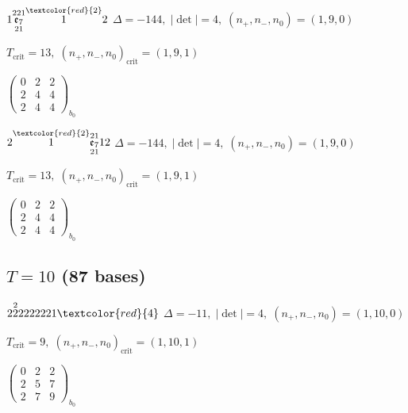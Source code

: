 \documentclass[10pt]{article}
\begin{document}
\smallskip

$1\overset{221}{\underset{21}{\mathfrak{e}_7}}\overset{\textcolor{red}{2}}{1}2$ \quad $\Delta=-144,\; |\det|=4,\; (n_+,n_-,n_0)=(1,9,0)$

\hspace{1em}$T_{\text{crit}}=13,\; (n_+,n_-,n_0)_{\text{crit}}=(1,9,1)$

\hspace{2em}$\left(\begin{smallmatrix}0 & 2 & 2 \\ 2 & 4 & 4 \\ 2 & 4 & 4\end{smallmatrix}\right)_{\!b_0}$

\smallskip

$2\overset{\textcolor{red}{2}}{1}\overset{21}{\underset{21}{\mathfrak{e}_7}}12$ \quad $\Delta=-144,\; |\det|=4,\; (n_+,n_-,n_0)=(1,9,0)$

\hspace{1em}$T_{\text{crit}}=13,\; (n_+,n_-,n_0)_{\text{crit}}=(1,9,1)$

\hspace{2em}$\left(\begin{smallmatrix}0 & 2 & 2 \\ 2 & 4 & 4 \\ 2 & 4 & 4\end{smallmatrix}\right)_{\!b_0}$


\subsection*{$T = 10$ \quad (87 bases)}
\smallskip

$2\overset{2}{2}2222221\textcolor{red}{4}$ \quad $\Delta=-11,\; |\det|=4,\; (n_+,n_-,n_0)=(1,10,0)$

\hspace{1em}$T_{\text{crit}}=9,\; (n_+,n_-,n_0)_{\text{crit}}=(1,10,1)$

\hspace{2em}$\left(\begin{smallmatrix}0 & 2 & 2 \\ 2 & 5 & 7 \\ 2 & 7 & 9\end{smallmatrix}\right)_{\!b_0}$

\smallskip
\end{document}
